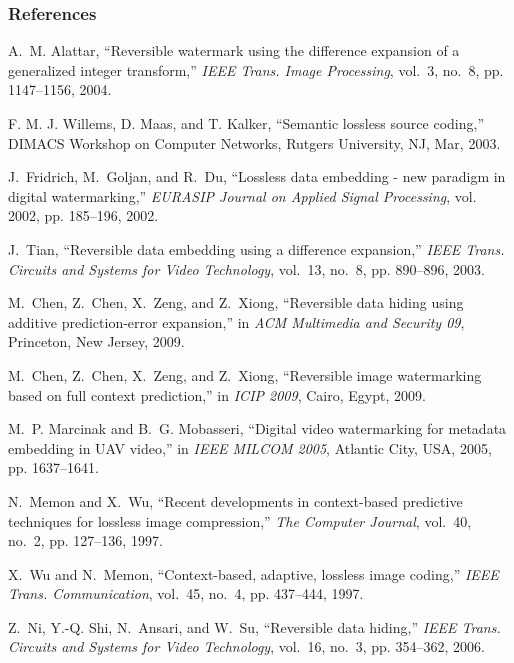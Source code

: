 \documentclass[slidestop,compress]{beamer}
\begin{document}
\begin{frame}
\frametitle{References}
\tiny{
    \begin{thebibliography}{10}
A.~M. Alattar, ``Reversible watermark using the difference expansion of a generalized integer
transform,'' \emph{IEEE Trans. Image Processing}, vol.~3, no.~8, pp.  1147--1156, 2004.

F. M. J. Willems, D. Maas, and T. Kalker, ``Semantic lossless source coding,'' DIMACS Workshop on
Computer Networks, Rutgers University, NJ, Mar, 2003.

J.~Fridrich, M.~Goljan, and R.~Du, ``Lossless data embedding - new paradigm in digital
watermarking,'' \emph{EURASIP Journal on Applied Signal Processing}, vol. 2002, pp. 185--196, 2002.

J.~Tian, ``Reversible data embedding using a difference expansion,'' \emph{IEEE Trans. Circuits and
Systems for Video Technology}, vol.~13, no.~8, pp.  890--896, 2003.

M.~Chen, Z.~Chen, X.~Zeng, and Z.~Xiong, ``Reversible data hiding using additive prediction-error
expansion,'' in \emph{ACM Multimedia and Security 09}, Princeton, New Jersey, 2009.

M.~Chen, Z.~Chen, X.~Zeng, and Z.~Xiong, ``Reversible image watermarking based on full context
prediction,'' in \emph{ICIP 2009}, Cairo, Egypt, 2009.

M.~P. Marcinak and B.~G. Mobasseri, ``Digital video watermarking for metadata
  embedding in \uppercase{UAV} video,'' in \emph{IEEE MILCOM 2005}, Atlantic
  City, USA, 2005, pp. 1637--1641.

N.~Memon and X.~Wu, ``Recent developments in context-based predictive
  techniques for lossless image compression,'' \emph{The Computer Journal},
  vol.~40, no.~2, pp. 127--136, 1997.

X.~Wu and N.~Memon, ``Context-based, adaptive, lossless image coding,'' \emph{IEEE Trans.
Communication}, vol.~45, no.~4, pp. 437--444, 1997.

Z.~Ni, Y.-Q. Shi, N.~Ansari, and W.~Su, ``Reversible data hiding,'' \emph{IEEE Trans. Circuits and
Systems for Video Technology}, vol.~16, no.~3, pp.  354--362, 2006.

    \end{thebibliography}
}
\end{frame}
\end{document}
